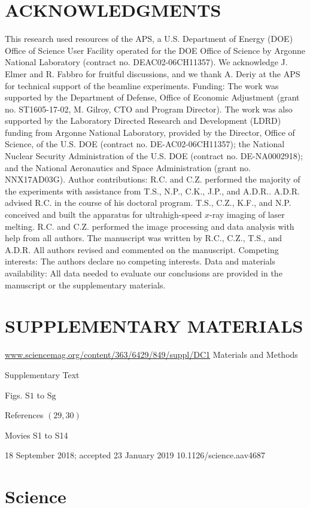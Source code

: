 \documentclass[10pt]{article}
\begin{document}
\section*{ACKNOWLEDGMENTS}
This research used resources of the APS, a U.S. Department of Energy (DOE) Office of Science User Facility operated for the DOE Office of Science by Argonne National Laboratory (contract no. DEAC02-06CH11357). We acknowledge J. Elmer and R. Fabbro for fruitful discussions, and we thank A. Deriy at the APS for technical support of the beamline experiments. Funding: The work was supported by the Department of Defense, Office of Economic Adjustment (grant no. ST1605-17-02, M. Gilroy, CTO and Program Director). The work was also supported by the Laboratory Directed Research and Development (LDRD) funding from Argonne National Laboratory, provided by the Director, Office of Science, of the U.S. DOE (contract no. DE-AC02-06CH11357); the National Nuclear Security Administration of the U.S. DOE (contract no. DE-NA0002918); and the National Aeronautics and Space Administration (grant no. NNX17AD03G). Author contributions: R.C. and C.Z. performed the majority of the experiments with assistance from T.S., N.P., C.K., J.P., and A.D.R.. A.D.R. advised R.C. in the course of his doctoral program. T.S., C.Z., K.F., and N.P. conceived and built the apparatus for ultrahigh-speed $x$-ray imaging of laser melting. R.C. and C.Z. performed the image processing and data analysis with help from all authors. The manuscript was written by R.C., C.Z., T.S., and A.D.R. All authors revised and commented on the manuscript. Competing interests: The authors declare no competing interests. Data and materials availability: All data needed to evaluate our conclusions are provided in the manuscript or the supplementary materials.

\section*{SUPPLEMENTARY MATERIALS}
\href{http://www.sciencemag.org/content/363/6429/849/suppl/DC1}{www.sciencemag.org/content/363/6429/849/suppl/DC1} Materials and Methods

Supplementary Text

Figs. $\mathrm{S} 1$ to $\mathrm{Sg}$

References $(29,30)$

Movies S1 to S14

18 September 2018; accepted 23 January 2019 10.1126/science.aav4687

\section*{Science}
\end{document}
